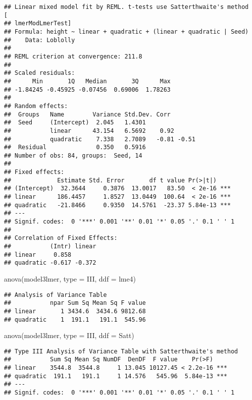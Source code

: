 \documentclass[
]{book}
\newenvironment{Shaded}{\begin{snugshade}}{\end{snugshade}}
\newcommand{\AttributeTok}[1]{\textcolor[rgb]{0.77,0.63,0.00}{#1}}
\newcommand{\FunctionTok}[1]{\textcolor[rgb]{0.00,0.00,0.00}{#1}}
\newcommand{\NormalTok}[1]{#1}
\newcommand{\StringTok}[1]{\textcolor[rgb]{0.31,0.60,0.02}{#1}}
\begin{document}
\begin{verbatim}
## Linear mixed model fit by REML. t-tests use Satterthwaite's method [
## lmerModLmerTest]
## Formula: height ~ linear + quadratic + (linear + quadratic | Seed)
##    Data: Loblolly
## 
## REML criterion at convergence: 211.8
## 
## Scaled residuals: 
##      Min       1Q   Median       3Q      Max 
## -1.84245 -0.45925 -0.07456  0.69006  1.78263 
## 
## Random effects:
##  Groups   Name        Variance Std.Dev. Corr       
##  Seed     (Intercept)  2.045   1.4301              
##           linear      43.154   6.5692    0.92      
##           quadratic    7.338   2.7089   -0.81 -0.51
##  Residual              0.350   0.5916              
## Number of obs: 84, groups:  Seed, 14
## 
## Fixed effects:
##             Estimate Std. Error       df t value Pr(>|t|)    
## (Intercept)  32.3644     0.3876  13.0017   83.50  < 2e-16 ***
## linear      186.4457     1.8527  13.0449  100.64  < 2e-16 ***
## quadratic   -21.8466     0.9350  14.5761  -23.37 5.84e-13 ***
## ---
## Signif. codes:  0 '***' 0.001 '**' 0.01 '*' 0.05 '.' 0.1 ' ' 1
## 
## Correlation of Fixed Effects:
##           (Intr) linear
## linear     0.858       
## quadratic -0.617 -0.372
\end{verbatim}

\begin{Shaded}
\begin{Highlighting}[]
\FunctionTok{anova}\NormalTok{(model3lmer, }\AttributeTok{type =} \StringTok{\textquotesingle{}III\textquotesingle{}}\NormalTok{, }\AttributeTok{ddf =} \StringTok{\textquotesingle{}lme4\textquotesingle{}}\NormalTok{)}
\end{Highlighting}
\end{Shaded}

\begin{verbatim}
## Analysis of Variance Table
##           npar Sum Sq Mean Sq F value
## linear       1 3434.6  3434.6 9812.68
## quadratic    1  191.1   191.1  545.96
\end{verbatim}

\begin{Shaded}
\begin{Highlighting}[]
\FunctionTok{anova}\NormalTok{(model3lmer, }\AttributeTok{type =} \StringTok{\textquotesingle{}III\textquotesingle{}}\NormalTok{, }\AttributeTok{ddf =} \StringTok{\textquotesingle{}Satt\textquotesingle{}}\NormalTok{)}
\end{Highlighting}
\end{Shaded}

\begin{verbatim}
## Type III Analysis of Variance Table with Satterthwaite's method
##           Sum Sq Mean Sq NumDF  DenDF  F value    Pr(>F)    
## linear    3544.8  3544.8     1 13.045 10127.45 < 2.2e-16 ***
## quadratic  191.1   191.1     1 14.576   545.96  5.84e-13 ***
## ---
## Signif. codes:  0 '***' 0.001 '**' 0.01 '*' 0.05 '.' 0.1 ' ' 1
\end{verbatim}
\end{document}
